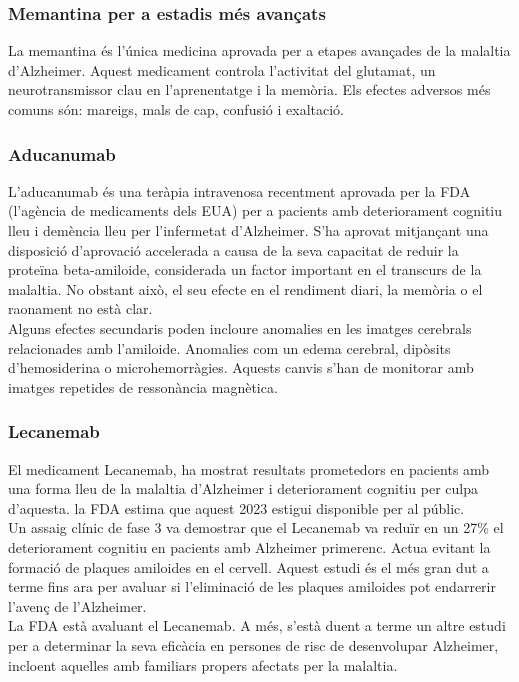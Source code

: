 \documentclass[a4paper,12pt]{article}
\begin{document}
\subsubsection*{Memantina per a estadis més avançats}
La memantina és l'única medicina aprovada per a etapes avançades de la malaltia d'Alzheimer. Aquest medicament controla l'activitat del glutamat, un neurotransmissor clau en l'aprenentatge i la memòria. Els efectes adversos més comuns són: mareigs, mals de cap, confusió i exaltació.
\subsubsection*{Aducanumab}
L'aducanumab és una teràpia intravenosa recentment aprovada per la FDA (l'agència de medicaments dels EUA) per a pacients amb deteriorament cognitiu lleu i demència lleu per l'infermetat d'Alzheimer. S'ha aprovat mitjançant una disposició d'aprovació accelerada a causa de la seva capacitat de reduir la proteïna beta-amiloide, considerada un factor important en el transcurs de la malaltia. No obstant això, el seu efecte en el rendiment diari, la memòria o el raonament no està clar.\\
Alguns efectes secundaris poden incloure anomalies en les imatges cerebrals relacionades amb l'amiloide. Anomalies com un edema cerebral, dipòsits  d'hemosiderina o microhemorràgies. Aquests canvis s'han de monitorar amb imatges repetides de ressonància magnètica.
\subsubsection*{Lecanemab}
El medicament Lecanemab, ha mostrat resultats prometedors en pacients amb una forma lleu de la malaltia d'Alzheimer i deteriorament cognitiu per culpa d'aquesta. la FDA estima que aquest 2023 estigui disponible per al públic.\\
Un assaig clínic de fase 3 va demostrar que el Lecanemab va reduïr en un 27\% el deteriorament cognitiu en pacients amb Alzheimer primerenc. Actua evitant la formació de plaques amiloides en el cervell. Aquest estudi és el més gran dut a terme fins ara per avaluar si l'eliminació de les plaques amiloides pot endarrerir l'avenç de l'Alzheimer.\\
La FDA està avaluant el Lecanemab. A més, s'està duent a terme un altre estudi per a determinar la seva eficàcia en persones de risc de desenvolupar Alzheimer, incloent aquelles amb familiars propers afectats per la malaltia.
\end{document}
